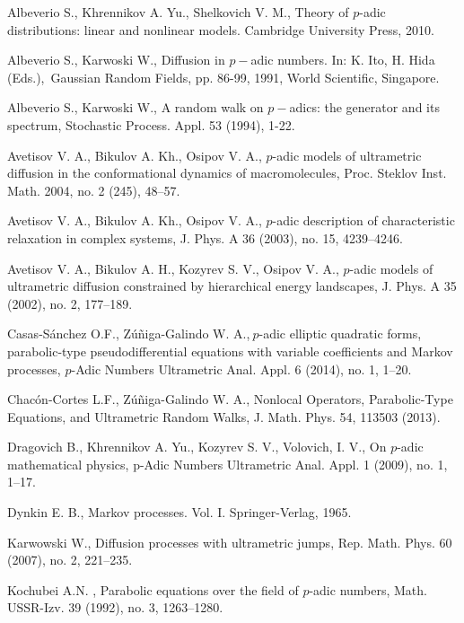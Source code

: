 \documentclass{amsart}\usepackage{amsfonts}
\theoremstyle{plain}
\numberwithin{equation}{section}
\begin{document}
\begin{thebibliography}{99}                                                                                               

Albeverio S., Khrennikov A. Yu., Shelkovich V. M., Theory of
$p$-adic distributions: linear and nonlinear models. Cambridge University
Press, 2010.

Albeverio S., Karwoski W., Diffusion in $p-$adic numbers. In:
K. Ito, H. Hida (Eds.),\ Gaussian Random Fields, pp. 86-99, 1991, World
Scientific, Singapore.

Albeverio S., Karwoski W., A random walk on $p-$adics: the
generator and its spectrum, Stochastic Process. Appl. 53 (1994), 1-22.

Avetisov V. A., Bikulov A. Kh., Osipov V. A., $p$-adic models
of ultrametric diffusion in the conformational dynamics of macromolecules,
Proc. Steklov Inst. Math. 2004, no. 2 (245), 48--57.

Avetisov V. A., Bikulov A. Kh., Osipov V. A., $p$-adic
description of characteristic relaxation in complex systems, J. Phys. A 36
(2003), no. 15, 4239--4246.

Avetisov V. A., Bikulov A. H., Kozyrev S. V., Osipov V. A.,
$p$-adic models of ultrametric diffusion constrained by hierarchical energy
landscapes, J. Phys. A 35 (2002), no. 2, 177--189.

Casas-Sánchez O.F., Zúñiga-Galindo W. A.,$\ p$-adic elliptic
quadratic forms, parabolic-type pseudodifferential equations with variable
coefficients and Markov processes, $p$-Adic Numbers Ultrametric Anal. Appl. 6
(2014), no. 1, 1--20.

Chacón-Cortes L.F., Zúñiga-Galindo W. A., Nonlocal Operators,
Parabolic-Type Equations, and Ultrametric Random Walks, J. Math. Phys. 54,
113503 (2013).

Dragovich B., Khrennikov A. Yu., Kozyrev S. V., Volovich,
I. V., On $p$-adic mathematical physics, p-Adic Numbers Ultrametric Anal.
Appl. 1 (2009), no. 1, 1--17.

Dynkin E. B., Markov processes. Vol. I. Springer-Verlag, 1965.

Karwowski W., Diffusion processes with ultrametric jumps, Rep.
Math. Phys. 60 (2007), no. 2, 221--235.

Kochubei A.N. , Parabolic equations over the field of $p$-adic
numbers, Math. USSR-Izv. 39 (1992), no. 3, 1263--1280.


\end{thebibliography}
\end{document}
